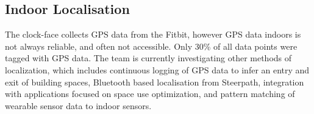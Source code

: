 










\subsection{Indoor Localisation}
\label{ch:localisation}

The clock-face collects GPS data from the Fitbit, however GPS data indoors is not always reliable, and often not accessible. Only 30\% of all data points were tagged with GPS data. The team is currently investigating other methods of localization, which includes continuous logging of GPS data to infer an entry and exit of building spaces, Bluetooth based localisation from Steerpath, integration with applications focused on space use optimization, and pattern matching of wearable sensor data to indoor sensors.

